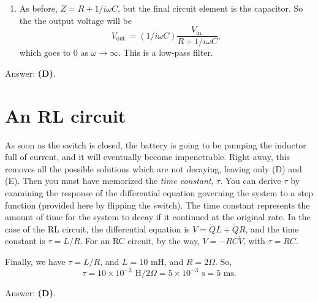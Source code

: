 \documentclass[11pt]{paper}
\newcommand{\answer}[1]{Answer: \textbf{(#1)}.}
\begin{document}
\begin{enumerate}[label=\Roman*.]
\item As before, $Z = R + 1/i\omega C$, but the final circuit element is the capacitor.  So the the output voltage will be
\begin{equation}
V_\text{out.} = \left(1/i\omega C\right)\frac{V_\text{in.}}{R+1/i\omega C},
\end{equation}
which goes to $0$ as $\omega \rightarrow \infty$.  This is a low-pass filter.
\end{enumerate}

\answer{D}

\section{An RL circuit}
As soon as the switch is closed, the battery is going to be pumping the inductor full of current, and it will eventually become impenetrable.  Right away, this removes all the possible solutions which are not decaying, leaving only (D) and (E).  Then you must have memorized the \emph{time constant}, $\tau$.  You can derive $\tau$ by examining the response of the differential equation governing the system to a step function (provided here by flipping the switch).  The time constant represents the amount of time for the system to decay if it continued at the original rate.  In the case of the RL circuit, the differential equation is $V = \ddot{Q}L + \dot{Q}R$, and the time constant is $\tau = L/R$.  For an RC circuit, by the way, $V = -RC\dot{V}$, with $\tau = RC$.

Finally, we have $\tau = L/R$, and $L = 10 \text{ mH}$, and $R = 2 \Omega$.  So,
\begin{equation}
\tau = 10\times10^{-3}\text{ H}/2\Omega = 5\times10^{-3}\text{ s} = 5\text{ ms}.
\end{equation}

\answer{D}
\end{document}

